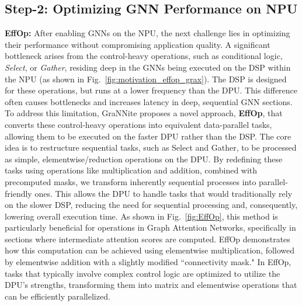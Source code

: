 \subsection{Step-2: Optimizing GNN Performance on NPU}
\textbf{EffOp:} After enabling GNNs on the NPU, the next challenge lies in optimizing their performance without compromising application quality. A significant bottleneck arises from the control-heavy operations, such as conditional logic, \textit{Select}, or \textit{Gather}, residing deep in the GNNs being executed on the DSP within the NPU (as shown in Fig.~\ref{fig:motivation_effop_grax}). 
The DSP is designed for these operations, but runs at a lower frequency than the DPU. This difference often causes bottlenecks and increases latency in deep, sequential GNN sections.
To address this limitation, GraNNite proposes a novel approach, \textbf{EffOp}, that converts these control-heavy operations into equivalent data-parallel tasks, allowing them to be executed on the faster DPU rather than the DSP. The core idea is to restructure sequential tasks, such as Select and Gather, to be processed as simple, elementwise/reduction operations on the DPU. By redefining these tasks using operations like multiplication and addition, combined with precomputed masks, we transform inherently sequential processes into parallel-friendly ones. This allows the DPU to handle tasks that would traditionally rely on the slower DSP, reducing the need for sequential processing and, consequently, lowering overall execution time.
As shown in Fig.~\ref{fig:EffOp}, this method is particularly beneficial for operations in Graph Attention Networks, specifically in sections where intermediate attention scores are computed. EffOp demonstrates how this computation can be achieved using elementwise multiplication, followed by elementwise addition with a slightly modified ``connectivity mask." In EffOp, tasks that typically involve complex control logic are optimized to utilize the DPU’s strengths, transforming them into matrix and elementwise operations that can be efficiently parallelized.
